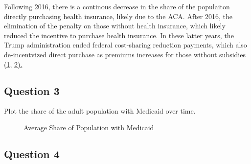 \documentclass[
]{article}
\begin{document}
Following 2016, there is a continous decrease in the share of the
populaiton directly purchasing health insurance, likely due to the ACA.
After 2016, the elimination of the penalty on those without health
insurance, which likely reduced the incentive to purchase health
insurance. In these latter years, the Trump administration ended federal
cost-sharing reduction payments, which also de-incentvized direct
purchase as premiums increases for those without subsidies
\href{https://www.kff.org/private-insurance/issue-brief/as-aca-marketplace-enrollment-reaches-record-high-fewer-are-buying-individual-market-coverage-elsewhere/\#:~:text=During\%20this\%20period\%20of\%20decreasing,Figure\%201}{(1,}
\href{https://usafacts.org/articles/affordable-care-act-and-data-who-insured-and-who-isnt/\#:~:text=Individual\%20mandate,Employer\%20mandate}{2).}

\subsection{Question 3}\label{question-3}

Plot the share of the adult population with Medicaid over time.

\begin{figure}


\caption{\label{fig-q3}Average Share of Population with Medicaid}

\end{figure}%

\subsection{Question 4}\label{question-4}
\end{document}

